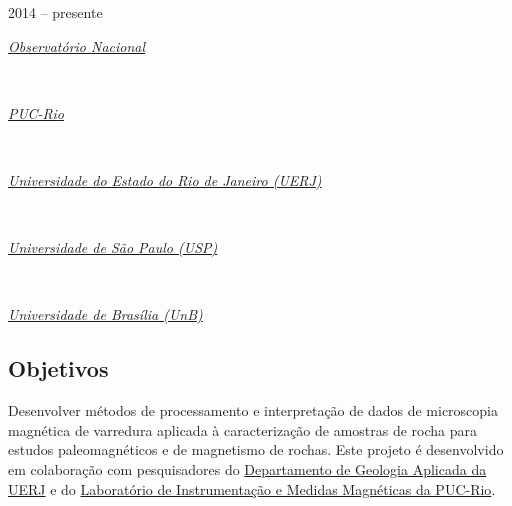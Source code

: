  2014 -- presente
\vspace{0.3\baselineskip}\\
\noindent\parbox{0.03\textwidth}{\vspace{-0.2\baselineskip}\faUniversity}
\href{https://www.gov.br/observatorio/pt-br}{\textsl{Observatório Nacional}}
\parbox{0.03\textwidth}{\vspace{-0.2\baselineskip} \hfill {}} \\
\noindent\parbox{0.03\textwidth}{\vspace{-0.2\baselineskip}\faUniversity}
\href{https://www.puc-rio.br/index.html}{\textsl{PUC-Rio}}
\parbox{0.03\textwidth}{\vspace{-0.2\baselineskip} \hfill {}} \\
\noindent\parbox{0.03\textwidth}{\vspace{-0.2\baselineskip}\faUniversity}
\href{https://www.uerj.br/}{\textsl{Universidade do Estado do Rio de Janeiro (UERJ)}}
\parbox{0.03\textwidth}{\vspace{-0.2\baselineskip} \hfill {}} \\
\noindent\parbox{0.03\textwidth}{\vspace{-0.2\baselineskip}\faUniversity}
\href{https://www5.usp.br/}{\textsl{Universidade de São Paulo (USP)}}
\parbox{0.03\textwidth}{\vspace{-0.2\baselineskip} \hfill {}} \\
\noindent\parbox{0.03\textwidth}{\vspace{-0.2\baselineskip}\faUniversity}
\href{https://www.unb.br/}{\textsl{Universidade de Brasília (UnB)}}
\parbox{0.03\textwidth}{\vspace{-0.2\baselineskip} \hfill {}}


\subsection*{Objetivos}

Desenvolver métodos de processamento e interpretação de dados de microscopia magnética 
de varredura aplicada à caracterização de amostras de rocha para estudos paleomagnéticos 
e de magnetismo de rochas. Este projeto é desenvolvido em colaboração com 
pesquisadores do 
\href{https://www.fgel.uerj.br/site/departamentos/depto-de-geologia-aplicada/dgap-quadro-de-pessoal/}{Departamento de Geologia Aplicada da UERJ} e do
\href{https://www.fis.puc-rio.br/instrumentacao-e-medidas-magneticas/}{Laboratório de Instrumentação e Medidas Magnéticas da PUC-Rio}.

